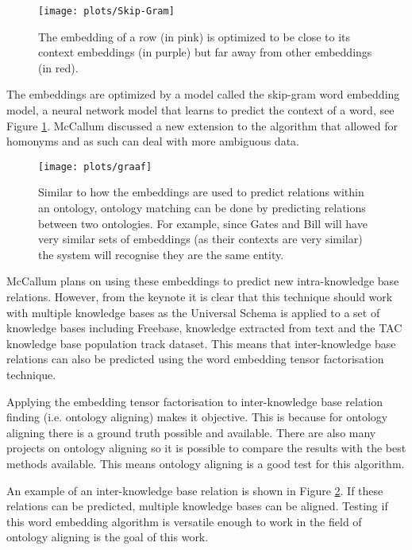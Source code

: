 \documentclass{article}
\begin{document}
 \begin{figure}[H]
 \centering
 \texttt{[image: plots/Skip-Gram]}
 \caption[Skip-Gram model]{The embedding of a row (in pink) is optimized to be close to its context embeddings (in purple) but far away from other embeddings (in red).}
 \label{Skip-Gram-img}
 \end{figure}
 
 The embeddings are optimized by a model called the skip-gram word embedding model\cite{w2v}, a neural network model that learns to predict the context of a word, see Figure \ref{Skip-Gram-img}. McCallum discussed a new extension to the algorithm that allowed for homonyms and as such can deal with more ambiguous data\cite{mccallumweblecture}.
  
 \begin{figure}[H]
 \centering
 \texttt{[image: plots/graaf]}
 \caption[Ontology matching graph example]{Similar to how the embeddings are used to predict relations within an ontology, ontology matching can be done by predicting relations between two ontologies. For example, since Gates and Bill will have very similar sets of embeddings (as their contexts are very similar) the system will recognise they are the same entity.}
 \label{merge_graph}
 \end{figure}
 
 McCallum plans on using these embeddings to predict new intra-knowledge base relations. However, from the keynote it is clear that this technique should work with multiple knowledge bases as the Universal Schema is applied to a set of knowledge bases including Freebase, knowledge extracted from text and the TAC knowledge base population track dataset. This means that inter-knowledge base relations can also be predicted using the word embedding tensor factorisation technique.
 
 Applying the embedding tensor factorisation to inter-knowledge base relation finding (i.e. ontology aligning) makes it objective. This is because for ontology aligning there is a ground truth possible and available. There are also many projects on ontology aligning so it is possible to compare the results with the best methods available. This means ontology aligning is a good test for this algorithm.
 
 An example of an inter-knowledge base relation is shown in Figure \ref{merge_graph}. If these relations can be predicted, multiple knowledge bases can be aligned. Testing if this word embedding algorithm is versatile enough to work in the field of ontology aligning is the goal of this work.
 
\end{document}
